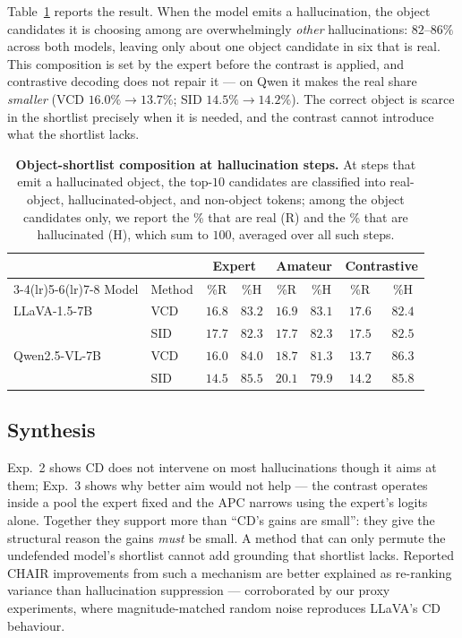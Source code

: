 Table~\ref{tab:cdmech-shortlist} reports the result. When the model emits a
hallucination, the object candidates it is choosing among are overwhelmingly
\emph{other} hallucinations: $82$--$86\%$ across both models, leaving only about
one object candidate in six that is real. This composition is set by the expert
before the contrast is applied, and contrastive decoding does not repair it ---
on Qwen it makes the real share \emph{smaller} (VCD $16.0\%\!\to\!13.7\%$; SID
$14.5\%\!\to\!14.2\%$). The correct object is scarce in the shortlist precisely
when it is needed, and the contrast cannot introduce what the shortlist lacks.

\begin{table}[t]
\centering
\small
\setlength{\tabcolsep}{5pt}
\caption{\textbf{Object-shortlist composition at hallucination steps.} At steps
that emit a hallucinated object, the top-$10$ candidates are classified into
real-object, hallucinated-object, and non-object tokens; among the object
candidates only, we report the \% that are real (R) and the \% that are
hallucinated (H), which sum to $100$, averaged over all such steps.}
\label{tab:cdmech-shortlist}
\begin{tabular}{ll cc cc cc}
\toprule
& & \multicolumn{2}{c}{Expert} & \multicolumn{2}{c}{Amateur} & \multicolumn{2}{c}{Contrastive} \\
\cmidrule(lr){3-4}\cmidrule(lr){5-6}\cmidrule(lr){7-8}
Model & Method & \%R & \%H & \%R & \%H & \%R & \%H \\
\midrule
LLaVA-1.5-7B & VCD & $16.8$ & $83.2$ & $16.9$ & $83.1$ & $17.6$ & $82.4$ \\
 & SID & $17.7$ & $82.3$ & $17.7$ & $82.3$ & $17.5$ & $82.5$ \\
Qwen2.5-VL-7B & VCD & $16.0$ & $84.0$ & $18.7$ & $81.3$ & $13.7$ & $86.3$ \\
 & SID & $14.5$ & $85.5$ & $20.1$ & $79.9$ & $14.2$ & $85.8$ \\
\bottomrule
\end{tabular}
\end{table}

\subsection{Synthesis}
\label{subsec:cdmech-res-synthesis}

Exp.~2 shows CD does not intervene on most hallucinations though it aims at
them; Exp.~3 shows why better aim would not help --- the contrast operates
inside a pool the expert fixed and the APC narrows using the expert's logits
alone. Together they support more than ``CD's gains are small'': they give the
structural reason the gains \emph{must} be small. A method that can only permute
the undefended model's shortlist cannot add grounding that shortlist lacks.
Reported CHAIR improvements from such a mechanism are better explained as
re-ranking variance than hallucination suppression --- corroborated by our proxy
experiments, where magnitude-matched random noise reproduces LLaVA's CD
behaviour.

